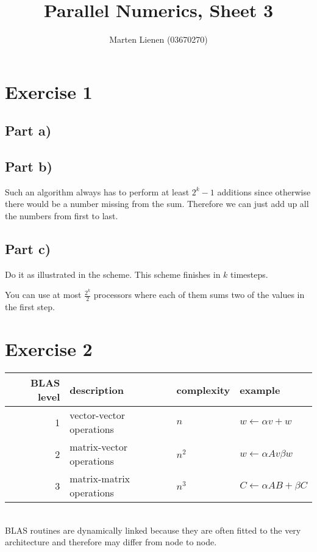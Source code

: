 \documentclass[10pt,a4paper]{article}
\title{Parallel Numerics, Sheet 3}
\author{Marten Lienen (03670270)}
\begin{document}
\maketitle

\section*{Exercise 1}

\subsection*{Part a)}

\subsection*{Part b)}

Such an algorithm always has to perform at least $2^{k} - 1$ additions since otherwise there would be a number missing from the sum.
Therefore we can just add up all the numbers from first to last.

\subsection*{Part c)}

Do it as illustrated in the scheme.
This scheme finishes in $k$ timesteps.

You can use at most $\frac{2^{k}}{2}$ processors where each of them sums two of the values in the first step.

\section*{Exercise 2}

\begin{tabular}{rlll}
BLAS level & description & complexity & example\\
\hline
1 & vector-vector operations & $n$ & $w \leftarrow \alpha v + w$\\
2 & matrix-vector operations & $n^{2}$ & $w \leftarrow \alpha Av \beta w$\\
3 & matrix-matrix operations & $n^{3}$ & $C \leftarrow  \alpha AB + \beta C$\\
\end{tabular}
\begin{comment}
#+ORGTBL: SEND exercise-2 orgtbl-to-latex :splice nil :skip 0 :raw t
| BLAS level | description              | complexity | example                             |
|------------+--------------------------+------------+-------------------------------------|
|          1 | vector-vector operations | $n$        | $w \leftarrow \alpha v + w$         |
|          2 | matrix-vector operations | $n^{2}$    | $w \leftarrow \alpha Av + \beta w$     |
|          3 | matrix-matrix operations | $n^{3}$    | $C \leftarrow  \alpha AB + \beta C$ |
\end{comment}
\\
BLAS routines are dynamically linked because they are often fitted to the very architecture and therefore may differ from node to node.
\end{document}
